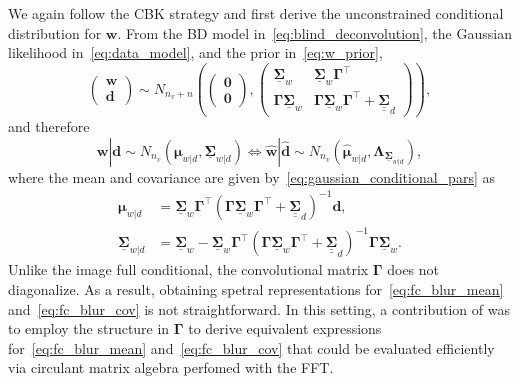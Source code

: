 \documentclass[12pt]{article}
\newcommand{\mycirc}[1] {\underline{\bm{#1}}}
\newcommand{\mybcirc}[1] {\underline{\underline{\bm{#1}}}}
\begin{document}
We again follow the CBK strategy and first derive the unconstrained conditional distribution for $\bm{w}$. From the BD model in~\eqref{eq:blind_deconvolution}, the Gaussian likelihood in~\eqref{eq:data_model}, and the prior in~\eqref{eq:w_prior},
\begin{equation}
\label{eq:joint_wd}
\begin{pmatrix}
\bm{w}\\
\bm{d}
\end{pmatrix}
\sim
N_{n_v+n}
\left(
\begin{pmatrix}
\bm{0}\\
\bm{0}
\end{pmatrix},
\begin{pmatrix}
\mycirc{\Sigma}_w
&
\mycirc{\Sigma}_w \bm{\Gamma}^{\top}
\\
\bm{\Gamma}\mycirc{\Sigma}_w
&
\bm{\Gamma}\mycirc{\Sigma}_w \bm{\Gamma}^{\top}
+
\mybcirc{\Sigma}_d
\end{pmatrix}
\right),
\end{equation}
and therefore
\begin{equation} \label{eq:fc_wavelet_unconstr}
    \bm{w}|\bm{d} \sim N_{n_v}(\bm{\mu}_{w|d}, \mycirc{\Sigma}_{w|d})
    \iff
    \hat{\bm{w}}|\hat{\bm{d}} \sim N_{n_v}(\hat{\bm{\mu}}_{w|d}, \bm{\Lambda}_{\mycirc{\Sigma}_{w|d}}),
\end{equation}
where the mean and covariance are given by~\eqref{eq:gaussian_conditional_pars} as
\begin{subequations}\label{eq:fc_blur_pars}
\begin{align} 
\bm{\mu}_{w|d} &= \mycirc{\Sigma}_w \bm{\Gamma}^{\top} (\bm{\Gamma} \mycirc{\Sigma}_w \bm{\Gamma}^{\top} + \mybcirc{\Sigma}_d)^{-1} \bm{d}, \label{eq:fc_blur_mean}\\
\mycirc{\Sigma}_{w|d} &= \mycirc{\Sigma}_w - \mycirc{\Sigma}_w\bm{\Gamma}^{\top} (\bm{\Gamma}\mycirc{\Sigma}_w\bm{\Gamma}^{\top}+\mybcirc{\Sigma}_d)^{-1}\bm{\Gamma}\mycirc{\Sigma}_w. \label{eq:fc_blur_cov}
\end{align}
\end{subequations}
Unlike the image full conditional, the convolutional matrix $\bm{\Gamma}$ does not diagonalize. As a result, 
obtaining spetral representations
for~\eqref{eq:fc_blur_mean} and~\eqref{eq:fc_blur_cov} is not straightforward.
In this setting, a contribution of \citet{Senn2025} was to employ the structure in $\bm{\Gamma}$ to derive equivalent expressions for~\eqref{eq:fc_blur_mean} and~\eqref{eq:fc_blur_cov} that could be evaluated efficiently via circulant matrix algebra perfomed with the FFT. 
\end{document}
